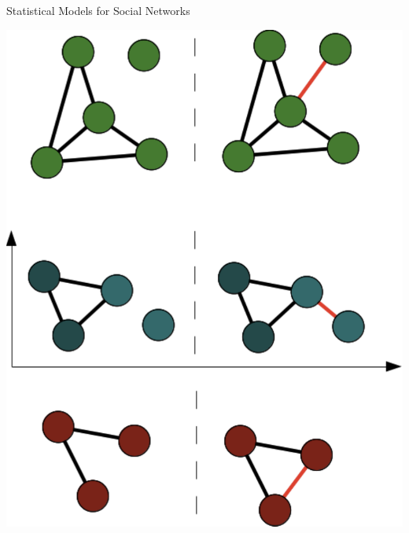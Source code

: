 \documentclass[10pt]{beamer}
\begin{document}
\begin{frame}{Statistical Models for Social Networks}
{\begin{textblock*}{50mm}
\includegraphics[width=1\linewidth]{graphics/exampleNetwork2.pdf} 
\end{textblock*}

}
\end{frame}
\end{document}
